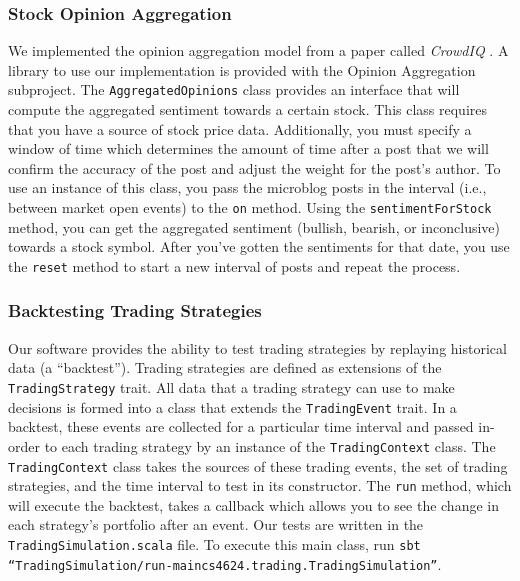 \subsubsection{Stock Opinion Aggregation}

We implemented the opinion aggregation model from a paper called \textit{CrowdIQ} \cite{crowdiq}.
A library to use our implementation is provided with the Opinion Aggregation subproject.
The \texttt{AggregatedOpinions} class provides an interface that will compute the aggregated sentiment towards a certain stock.
This class requires that you have a source of stock price data.
Additionally, you must specify a window of time which determines the amount of time after a post that we will confirm the accuracy of the post and adjust the weight for the post's author.
To use an instance of this class, you pass the microblog posts in the interval (i.e., between market open events) to the \texttt{on} method.
Using the \texttt{sentimentForStock} method, you can get the aggregated sentiment (bullish, bearish, or inconclusive) towards a stock symbol.
After you've gotten the sentiments for that date, you use the \texttt{reset} method to start a new interval of posts and repeat the process.

\subsubsection{Backtesting Trading Strategies}

Our software provides the ability to test trading strategies by replaying historical data (a ``backtest'').
Trading strategies are defined as extensions of the \texttt{Trading\-Strategy} trait.
All data that a trading strategy can use to make decisions is formed into a class that extends the \texttt{Trading\-Event} trait.
In a backtest, these events are collected for a particular time interval and passed in-order to each trading strategy by an instance of the \texttt{Trading\-Context} class.
The \texttt{Trading\-Context} class takes the sources of these trading events, the set of trading strategies, and the time interval to test in its constructor.
The \texttt{run} method, which will execute the backtest, takes a callback which allows you to see the change in each strategy's portfolio after an event.
Our tests are written in the \texttt{Trading\-Simulation.scala} file.
To execute this main class, run \texttt{sbt ``TradingSimulation/run-main\allowbreak cs4624.trading.TradingSimulation''}.

